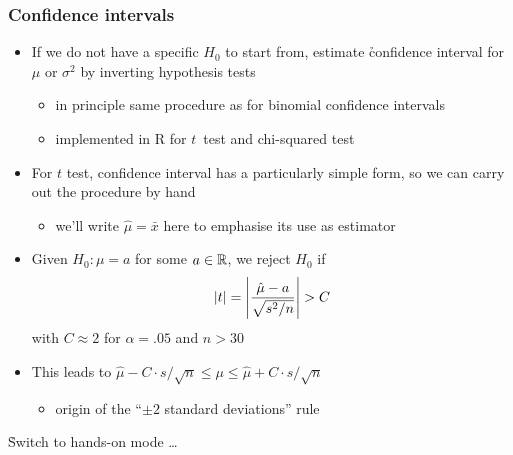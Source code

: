 \documentclass[t]{beamer} %
\begin{document}
\begin{frame}
  \frametitle{Confidence intervals}
  
  \begin{itemize}
  \item If we do not have a specific $H_0$ to start from, estimate
    \h{confidence interval} for $\mu$ or $\sigma^2$ by inverting hypothesis
    tests
    \begin{itemize}
    \item in principle same procedure as for binomial confidence intervals
    \item implemented in R for $t$~test and chi-squared test
    \end{itemize}
  \item For $t$ test, confidence interval has a particularly simple form, so
    we can carry out the procedure by hand
    \begin{itemize}
    \item we'll write $\hat{\mu} = \bar{x}$ here to emphasise its use as
      estimator
    \end{itemize}
    \pause
  \item Given $H_0: \mu = a$ for some $a\in\mathbb{R}$, we reject $H_0$ if
    \[
    \lvert t\rvert = \left\lvert \frac{\hat{\mu} - a}{\sqrt{s^2 / n}}\right\rvert > C
    \]
    with $C\approx 2$ for $\alpha = .05$ and $n > 30$%
    \pause
  \item This leads to $\hat{\mu} - C\cdot s / \sqrt{n} \leq \mu \leq
    \hat{\mu} + C\cdot s / \sqrt{n}$
    \begin{itemize}
    \item[\hand] origin of the ``$\pm 2$ standard deviations'' rule
    \end{itemize}
  \end{itemize}
\end{frame}





\begin{frame}[c]

  \begin{center}
    \h{\Large Switch to hands-on mode \ldots}
  \end{center}
\end{frame}
\end{document}

